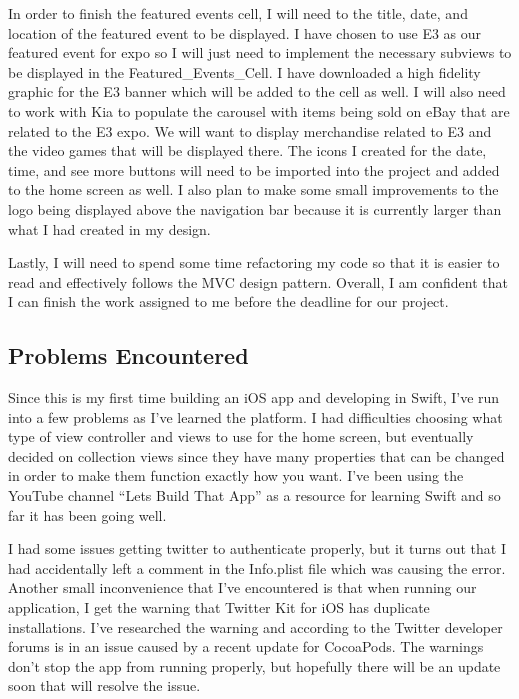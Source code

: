 \documentclass[onecolumn, draftclsnofoot,10pt, compsoc]{IEEEtran}
\begin{document}
In order to finish the featured events cell, I will need to the title, date, and location of the featured event to be displayed. I have chosen to use E3 as our featured event for expo so I will just need to implement the necessary subviews to be displayed in the Featured\_Events\_Cell. I have downloaded a high fidelity graphic for the E3 banner which will be added to the cell as well. I will also need to work with Kia to populate the carousel with items being sold on eBay that are related to the E3 expo. We will want to display merchandise related to E3 and the video games that will be displayed there. The icons I created for the date, time, and see more buttons will need to be imported into the project and added to the home screen as well. I also plan to make some small improvements to the logo being displayed above the navigation bar because it is currently larger than what I had created in my design.

Lastly, I will need to spend some time refactoring my code so that it is easier to read and effectively follows the MVC design pattern. Overall, I am confident that I can finish the work assigned to me before the deadline for our project.

\subsection{Problems Encountered}
Since this is my first time building an iOS app and developing in Swift, I’ve run into a few problems as I’ve learned the platform. I had difficulties choosing what type of view controller and views to use for the home screen, but eventually decided on collection views since they have many properties that can be changed in order to make them function exactly how you want. I’ve been using the YouTube channel “Lets Build That App” as a resource for learning Swift and so far it has been going well.

I had some issues getting twitter to authenticate properly, but it turns out that I had accidentally left a comment in the Info.plist file which was causing the error. Another small inconvenience that I’ve encountered is that when running our application, I get the warning that Twitter Kit for iOS has duplicate installations. I’ve researched the warning and according to the Twitter developer forums is in an issue caused by a recent update for CocoaPods. The warnings don’t stop the app from running properly, but hopefully there will be an update soon that will resolve the issue.
\end{document}
